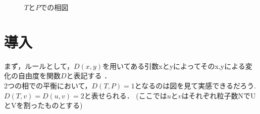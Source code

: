 \documentclass{jsarticle}
\numberwithin{equation}{section}
\theoremstyle{definition}
\begin{document}
\begin{figure}[h]
\begin{tikzpicture}[x=0.75pt,y=0.75pt,yscale=-0.7,xscale=0.85]
\end{tikzpicture}
\caption{\(T\)と\(P\)での相図}
\end{figure}
\section{導入}
まず，ルールとして，\(D(x,y)\)を用いてある引数xとyによってそのx,yによる変化の自由度を関数\(D\)と表記する
．\\
2つの相での平衡において，$D(T, P) = 1$となるのは図を見て実感できるだろう. $D(T, v) = D(u, v) = 2$と表せられる．
(ここでは\(uとv\)はそれぞれ粒子数NでUとVを割ったものとする)
\end{document}
